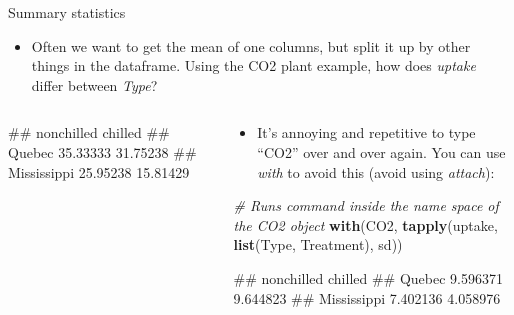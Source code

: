 \documentclass[
  ignorenonframetext,
  aspectratio=169]{beamer}
\newenvironment{Shaded}{\begin{snugshade}}{\end{snugshade}}
\newcommand{\CommentTok}[1]{\textcolor[rgb]{0.56,0.35,0.01}{\textit{#1}}}
\newcommand{\FunctionTok}[1]{\textcolor[rgb]{0.13,0.29,0.53}{\textbf{#1}}}
\newcommand{\NormalTok}[1]{#1}
\newcommand{\SpecialCharTok}[1]{\textcolor[rgb]{0.81,0.36,0.00}{\textbf{#1}}}
\providecommand{\tightlist}{%
  \setlength{\itemsep}{0pt}\setlength{\parskip}{0pt}}
\let\oldShaded\Shaded %
\let\endoldShaded\endShaded
\renewenvironment{Shaded}{\footnotesize\oldShaded}{\endoldShaded}
\let\oldverbatim\verbatim %Change fontsize of code chunk output
\let\endoldverbatim\endverbatim
\renewenvironment{verbatim}{\footnotesize\oldverbatim}{\endoldverbatim}
\begin{document}
\begin{frame}[fragile]{Summary statistics}
\protect\hypertarget{summary-statistics}{}
\begin{itemize}[<+->]
\tightlist
\item
  Often we want to get the mean of one columns, but split it up by other
  things in the dataframe. Using the CO2 plant example, how does
  \emph{uptake} differ between \emph{Type}?
\end{itemize}

\begin{columns}[T]
\begin{column}{0.48\textwidth}
\begin{Shaded}
\end{Shaded}

\begin{verbatim}
##             nonchilled  chilled
## Quebec        35.33333 31.75238
## Mississippi   25.95238 15.81429
\end{verbatim}
\end{column}

\begin{column}{0.48\textwidth}
\begin{itemize}[<+->]
\tightlist
\item
  It's annoying and repetitive to type ``CO2'' over and over again. You
  can use \emph{with} to avoid this (avoid using \emph{attach}):
\end{itemize}

\begin{Shaded}
\begin{Highlighting}[]
\CommentTok{\# Runs command inside the name space of the CO2 object}
\FunctionTok{with}\NormalTok{(CO2, }\FunctionTok{tapply}\NormalTok{(uptake, }\FunctionTok{list}\NormalTok{(Type, Treatment), sd))}
\end{Highlighting}
\end{Shaded}

\begin{verbatim}
##             nonchilled  chilled
## Quebec        9.596371 9.644823
## Mississippi   7.402136 4.058976
\end{verbatim}
\end{column}
\end{columns}
\end{frame}
\end{document}
